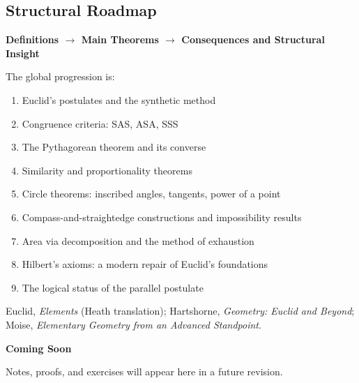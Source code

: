 \subsection*{Structural Roadmap}

\begin{center}
\textbf{Definitions $\longrightarrow$ Main Theorems
$\longrightarrow$ Consequences and Structural Insight}
\end{center}

The global progression is:

\begin{enumerate}
  \item Euclid's postulates and the synthetic method
  \item Congruence criteria: SAS, ASA, SSS
  \item The Pythagorean theorem and its converse
  \item Similarity and proportionality theorems
  \item Circle theorems: inscribed angles, tangents, power of a point
  \item Compass-and-straightedge constructions and impossibility results
  \item Area via decomposition and the method of exhaustion
  \item Hilbert's axioms: a modern repair of Euclid's foundations
  \item The logical status of the parallel postulate
\end{enumerate}

\begin{remark*}
Euclid, \textit{Elements} (Heath translation);
Hartshorne, \textit{Geometry: Euclid and Beyond};
Moise, \textit{Elementary Geometry from an Advanced Standpoint}.
\end{remark*}

\vspace{1em}
\begin{tcolorbox}[
  colback=gray!6, colframe=gray!40, arc=2pt,
  left=8pt, right=8pt, top=6pt, bottom=6pt,
  title={\small\textbf{Status: Planned}},
  fonttitle=\small\bfseries
]
\begin{center}\Large\bfseries Coming Soon\end{center}
\vspace{6pt}
\noindent Notes, proofs, and exercises will appear here in a future revision.
\end{tcolorbox}

